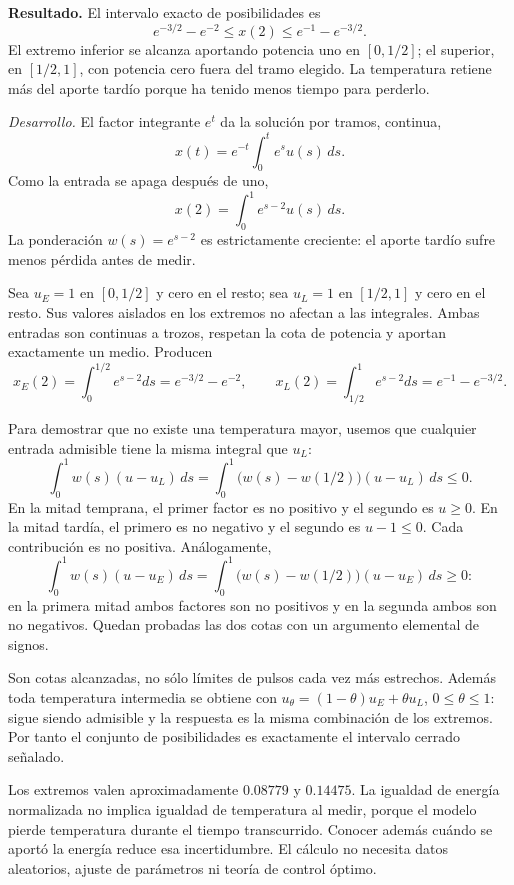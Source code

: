 \noindent\textbf{Resultado.} El intervalo exacto de posibilidades es
\[
e^{-3/2}-e^{-2}\le x(2)\le e^{-1}-e^{-3/2}.
\]
El extremo inferior se alcanza aportando potencia uno en \([0,1/2]\); el superior, en \([1/2,1]\), con potencia cero fuera del tramo elegido. La temperatura retiene más del aporte tardío porque ha tenido menos tiempo para perderlo.

\noindent\textit{Desarrollo.} El factor integrante \(e^t\) da la solución por tramos, continua,
\[
x(t)=e^{-t}\int_0^t e^s u(s)\,ds.
\]
Como la entrada se apaga después de uno,
\[
x(2)=\int_0^1 e^{s-2}u(s)\,ds.
\]
La ponderación \(w(s)=e^{s-2}\) es estrictamente creciente: el aporte tardío sufre menos pérdida antes de medir.

Sea \(u_E=1\) en \([0,1/2]\) y cero en el resto; sea \(u_L=1\) en \([1/2,1]\) y cero en el resto. Sus valores aislados en los extremos no afectan a las integrales. Ambas entradas son continuas a trozos, respetan la cota de potencia y aportan exactamente un medio. Producen
\[
x_E(2)=\int_0^{1/2}e^{s-2}ds=e^{-3/2}-e^{-2},
\qquad
x_L(2)=\int_{1/2}^1e^{s-2}ds=e^{-1}-e^{-3/2}.
\]

Para demostrar que no existe una temperatura mayor, usemos que cualquier entrada admisible tiene la misma integral que \(u_L\):
\[
\int_0^1w(s)(u-u_L)\,ds
=\int_0^1\bigl(w(s)-w(1/2)\bigr)(u-u_L)\,ds\le0.
\]
En la mitad temprana, el primer factor es no positivo y el segundo es \(u\ge0\). En la mitad tardía, el primero es no negativo y el segundo es \(u-1\le0\). Cada contribución es no positiva. Análogamente,
\[
\int_0^1w(s)(u-u_E)\,ds
=\int_0^1\bigl(w(s)-w(1/2)\bigr)(u-u_E)\,ds\ge0:
\]
en la primera mitad ambos factores son no positivos y en la segunda ambos son no negativos. Quedan probadas las dos cotas con un argumento elemental de signos.

Son cotas alcanzadas, no sólo límites de pulsos cada vez más estrechos. Además toda temperatura intermedia se obtiene con \(u_\theta=(1-\theta)u_E+\theta u_L\), \(0\le\theta\le1\): sigue siendo admisible y la respuesta es la misma combinación de los extremos. Por tanto el conjunto de posibilidades es exactamente el intervalo cerrado señalado.

Los extremos valen aproximadamente \(0.08779\) y \(0.14475\). La igualdad de energía normalizada no implica igualdad de temperatura al medir, porque el modelo pierde temperatura durante el tiempo transcurrido. Conocer además cuándo se aportó la energía reduce esa incertidumbre. El cálculo no necesita datos aleatorios, ajuste de parámetros ni teoría de control óptimo.
